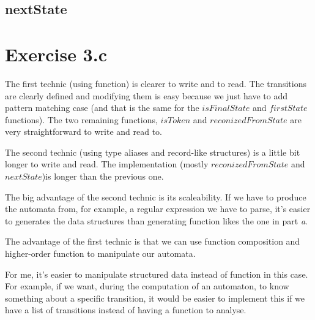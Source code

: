 \documentclass[a4paper,11pt]{report}
\newcommand{\ex}[3]{\haskellfile[firstline=#1,lastline=#2]{#3.hs}}
\begin{document}
\subsection*{nextState}
\ex{32}{38}{ex3b}

\section*{Exercise 3.c}

The first technic (using function) is clearer to write and to read. The
transitions are clearly defined and modifying them is easy because we just have
to add pattern matching case (and that is the same for the $isFinalState$ and
$firstState$ functions). The two remaining functions, $isToken$ and
$reconizedFromState$ are very straightforward to write and read to.

The second technic (using type aliases and record-like structures) is a little
bit longer to write and read. The implementation (mostly $reconizedFromState$
and $nextState$)is longer than the previous one.

The big advantage of the second technic is its scaleability. If we have to
produce the automata from, for example, a regular expression we have to parse,
it's easier to generates the data structures than generating function likes the
one in part \textit{a}.

The advantage of the first technic is that we can use function composition and
higher-order function to manipulate our automata.

For me, it's easier to manipulate structured data instead of function in this
case. For example, if we want, during the computation of an automaton, to know
something about a specific transition, it would be easier to implement this if we
have a list of transitions instead of having a function to analyse.
\end{document}
